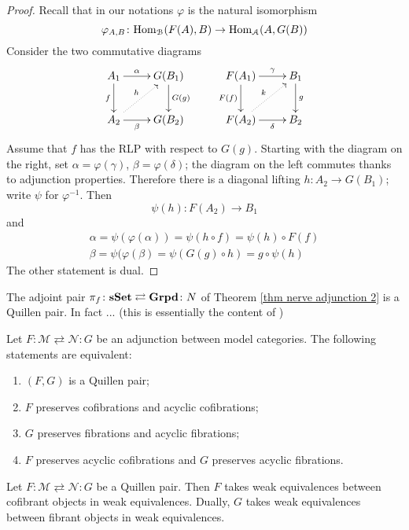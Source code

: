 \begin{refsection}
\begin{proof}
Recall that in our notations $\varphi$ is the natural isomorphism
\[
\varphi_{A,B} \colon \mathrm{Hom}_{\mathcal B}(F(A),B) \to \mathrm{Hom}_{\mathcal A}(A,G(B))
\]
Consider the two commutative diagrams
\[
\xymatrix{
A_1 \ar[d]_f \ar[r]^-\alpha & G(B_1) \ar[d]^{G(g)} \\ A_2 \ar[r]_-{\beta} \ar@{.>}[ur]^h & G(B_2)
} \qquad
\xymatrix{
F(A_1) \ar[d]_{F(f)} \ar[r]^-\gamma & B_1 \ar[d]^g \\ F(A_2) \ar@{.>}[ur]^k \ar[r]_-\delta & B_2
}
\]
Assume that $f$ has the RLP with respect to $G(g)$. Starting with the diagram on the right, set $\alpha = \varphi(\gamma)$, $\beta = \varphi(\delta)$; the diagram on the left commutes thanks to adjunction properties. Therefore there is a diagonal lifting $h \colon A_2 \to G(B_1)$; write $\psi$ for $\varphi^{-1}$. Then
\[
\psi(h) \colon F(A_2) \to B_1
\]
and
\begin{gather*}
\alpha = \psi(\varphi(\alpha)) = \psi(h \circ f) = \psi(h) \circ F(f) \\
\beta = \psi(\varphi(\beta) = \psi(G(g) \circ h) = g \circ \psi(h)
\end{gather*}
The other statement is dual.
\end{proof}

\begin{eg} \label{eg groupoids}
The adjoint pair $\pi_f \colon \mathbf{sSet} \rightleftarrows \mathbf{Grpd} \colon N$ of Theorem \ref{thm nerve adjunction 2} is a Quillen pair. In fact ... (this is essentially the content of \cite[Lemma 3.3]{hollander})
\end{eg}

\begin{cor} \label{cor Quillen pair}
Let $F \colon \mathcal M \rightleftarrows \mathcal N \colon G$ be an adjunction between model categories. The following statements are equivalent:
\begin{enumerate}
\item $(F,G)$ is a Quillen pair;
\item $F$ preserves cofibrations and acyclic cofibrations;
\item $G$ preserves fibrations and acyclic fibrations;
\item $F$ preserves acyclic cofibrations and $G$ preserves acyclic fibrations.
\end{enumerate}
\end{cor}

\begin{cor}
Let $F \colon \mathcal M \rightleftarrows \mathcal N \colon G$ be a Quillen pair. Then $F$ takes weak equivalences between cofibrant objects in weak equivalences. Dually, $G$ takes weak equivalences between fibrant objects in weak equivalences.
\end{cor}


\end{refsection}
